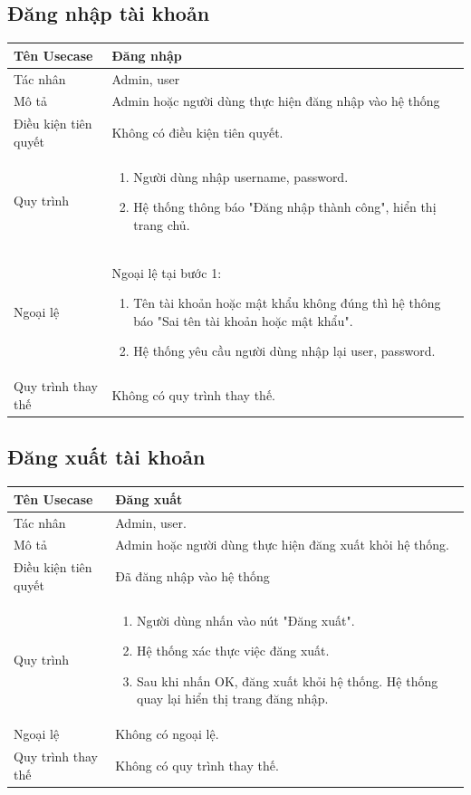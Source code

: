 \subsection{Đăng nhập tài khoản}
\begin{center}
	\begin{tabular}{|p{4cm}|p{10cm}|}
		\hline
		Tên Usecase & Đăng nhập\\ \hline
		Tác nhân & Admin, user\\ \hline
		Mô tả & Admin hoặc người dùng thực hiện đăng nhập vào hệ thống
		\\ \hline
		Điều kiện tiên quyết & Không có điều kiện tiên quyết. \\ \hline
		Quy trình & \begin{enumerate}
			\item Người dùng nhập username, password.
			\item Hệ thống thông báo "Đăng nhập thành công", hiển thị trang chủ.
		\end{enumerate}\\ \hline
		Ngoại lệ & Ngoại lệ tại bước 1: 
		\begin{enumerate} 
			\item Tên tài khoản hoặc mật khẩu không đúng thì hệ thông báo "Sai tên tài khoản hoặc mật khẩu". 
			\item Hệ thống yêu cầu người dùng nhập lại user, password.
		\end{enumerate}\\ \hline
		Quy trình thay thế & Không có quy trình thay thế. \\ \hline
		
	\end{tabular}
\end{center}
\subsection{Đăng xuất tài khoản}
\begin{center}
	\begin{tabular}{|p{4cm}|p{10cm}|}
		\hline
		Tên Usecase & Đăng xuất\\ \hline
		Tác nhân & Admin, user.\\ \hline
		Mô tả & Admin hoặc người dùng thực hiện đăng xuất khỏi hệ thống.
		\\ \hline
		Điều kiện tiên quyết & Đã đăng nhập vào hệ thống \\ \hline
		Quy trình & \begin{enumerate}
			\item  Người dùng nhấn vào nút "Đăng xuất".
			\item Hệ thống xác thực việc đăng xuất.
			\item Sau khi nhấn OK, đăng xuất khỏi hệ thống. Hệ thống quay lại hiển thị trang đăng nhập.
		\end{enumerate}\\ \hline
		Ngoại lệ & Không có ngoại lệ.\\ \hline
		Quy trình thay thế & Không có quy trình thay thế.\\ \hline
		
	\end{tabular}
\end{center}

